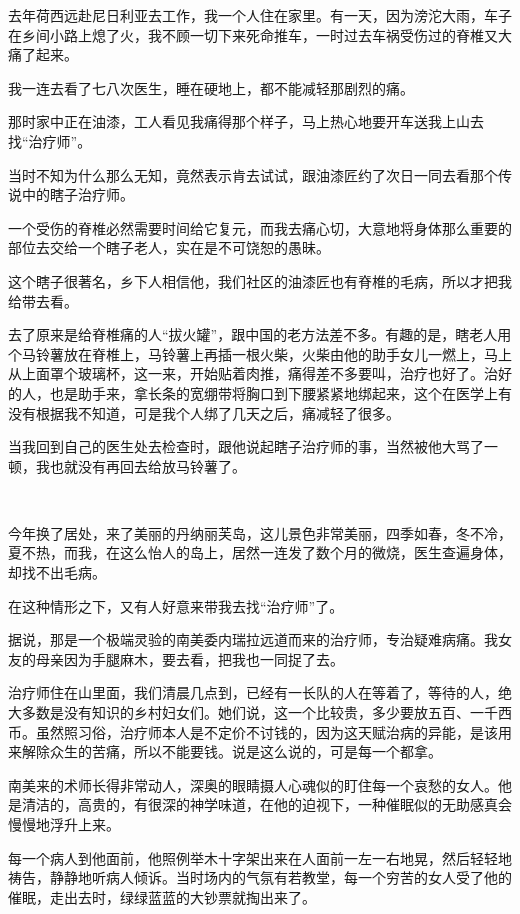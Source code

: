 \par 去年荷西远赴尼日利亚去工作，我一个人住在家里。有一天，因为滂沱大雨，车子在乡间小路上熄了火，我不顾一切下来死命推车，一时过去车祸受伤过的脊椎又大痛了起来。
\par 我一连去看了七八次医生，睡在硬地上，都不能减轻那剧烈的痛。
\par 那时家中正在油漆，工人看见我痛得那个样子，马上热心地要开车送我上山去找“治疗师”。
\par 当时不知为什么那么无知，竟然表示肯去试试，跟油漆匠约了次日一同去看那个传说中的瞎子治疗师。
\par 一个受伤的脊椎必然需要时间给它复元，而我去痛心切，大意地将身体那么重要的部位去交给一个瞎子老人，实在是不可饶恕的愚昧。
\par 这个瞎子很著名，乡下人相信他，我们社区的油漆匠也有脊椎的毛病，所以才把我给带去看。
\par 去了原来是给脊椎痛的人“拔火罐”，跟中国的老方法差不多。有趣的是，瞎老人用个马铃薯放在脊椎上，马铃薯上再插一根火柴，火柴由他的助手女儿一燃上，马上从上面罩个玻璃杯，这一来，开始贴着肉推，痛得差不多要叫，治疗也好了。治好的人，也是助手来，拿长条的宽绷带将胸口到下腰紧紧地绑起来，这个在医学上有没有根据我不知道，可是我个人绑了几天之后，痛减轻了很多。
\par 当我回到自己的医生处去检查时，跟他说起瞎子治疗师的事，当然被他大骂了一顿，我也就没有再回去给放马铃薯了。
\par  
\par 今年换了居处，来了美丽的丹纳丽芙岛，这儿景色非常美丽，四季如春，冬不冷，夏不热，而我，在这么怡人的岛上，居然一连发了数个月的微烧，医生查遍身体，却找不出毛病。
\par 在这种情形之下，又有人好意来带我去找“治疗师”了。
\par 据说，那是一个极端灵验的南美委内瑞拉远道而来的治疗师，专治疑难病痛。我女友的母亲因为手腿麻木，要去看，把我也一同捉了去。
\par 治疗师住在山里面，我们清晨几点到，已经有一长队的人在等着了，等待的人，绝大多数是没有知识的乡村妇女们。她们说，这一个比较贵，多少要放五百、一千西币。虽然照习俗，治疗师本人是不定价不讨钱的，因为这天赋治病的异能，是该用来解除众生的苦痛，所以不能要钱。说是这么说的，可是每一个都拿。
\par 南美来的术师长得非常动人，深奥的眼睛摄人心魂似的盯住每一个哀愁的女人。他是清洁的，高贵的，有很深的神学味道，在他的迫视下，一种催眠似的无助感真会慢慢地浮升上来。
\par 每一个病人到他面前，他照例举木十字架出来在人面前一左一右地晃，然后轻轻地祷告，静静地听病人倾诉。当时场内的气氛有若教堂，每一个穷苦的女人受了他的催眠，走出去时，绿绿蓝蓝的大钞票就掏出来了。
